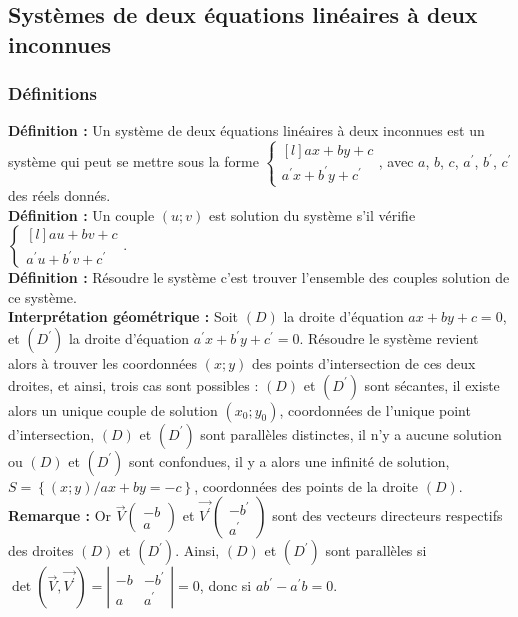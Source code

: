 \documentclass[a4paper,titlepage]{article}
\begin{document}
    \subsection{Systèmes de deux équations linéaires à deux inconnues}
        \subsubsection{Définitions}
            \textbf{Définition :} Un système de deux équations linéaires à deux inconnues est un système qui peut se mettre sous la forme $\left\{\begin{smallmatrix*}[l]ax+by+c\\a^{\prime}x+b^{\prime}y+c^{\prime}\end{smallmatrix*}\!\right.$, avec $a$, $b$, $c$, $a^{\prime}$, $b^{\prime}$, $c^{\prime}$ des réels donnés.
            \\
            \textbf{Définition :} Un couple $(u;v)$ est solution du système s’il vérifie $\left\{\begin{smallmatrix*}[l]au+bv+c\\a^{\prime}u+b^{\prime}v+c^{\prime}\end{smallmatrix*}\!\right.$.
            \\
            \textbf{Définition :} Résoudre le système c’est trouver l’ensemble des couples solution de ce système.
            \\
            \textbf{Interprétation géométrique :} Soit $\left(D\right)$ la droite d’équation $ax+by+c=0$, et $\left(D^{\prime}\right)$ la droite d’équation $a^{\prime}x+b^{\prime}y+c^{\prime}=0$. Résoudre le système revient alors à trouver les coordonnées $\left(x;y\right)$ des points d’intersection de ces deux droites, et ainsi, trois cas sont possibles : $\left(D\right)$ et $\left(D^{\prime}\right)$ sont sécantes, il existe alors un unique couple de solution $(x_{0};y_{0})$, coordonnées de l’unique point d’intersection, $\left(D\right)$ et $\left(D^{\prime}\right)$ sont parallèles distinctes, il n’y a aucune solution ou $\left(D\right)$ et $\left(D^{\prime}\right)$ sont confondues, il y a alors une infinité de solution, $S=\left\{\left(x;y\right)\!/ax+by=-c\right\}$, coordonnées des points de la droite $\left(D\right)$.
            \\
            \textbf{Remarque :} Or $\overrightarrow{V}\left(\begin{smallmatrix}-b\\a\end{smallmatrix}\right)$ et $\overrightarrow{V^{\prime}}\left(\begin{smallmatrix}-b^{\prime}\\a^{\prime}\end{smallmatrix}\right)$ sont des vecteurs directeurs respectifs des droites $\left(D\right)$ et $\left(D^{\prime}\right)$. Ainsi, $\left(D\right)$ et $\left(D^{\prime}\right)$ sont parallèles si $\det\left(\overrightarrow{V},\overrightarrow{V^{\prime}}\right)=\left|\begin{smallmatrix}-b&-b^{\prime}\\a&a^{\prime}\end{smallmatrix}\right|=0$, donc si $ab^{\prime}-a^{\prime}b=0$.
\end{document}
